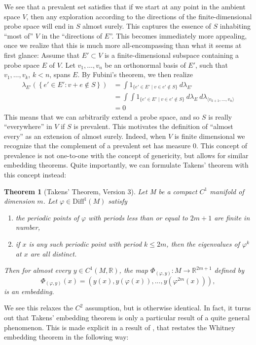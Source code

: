 \documentclass[11pt, a4paper]{memoir}
\theoremstyle{break}
\newtheorem{thm}{Theorem}
\theoremstyle{break}
\theoremstyle{nonumberplain}
\newcommand{\mR}{\mathbb{R}}
\begin{document}
We see that a prevalent set satisfies that if we start at any point in the ambient space $V$, then any exploration according to the directions of the finite-dimensional probe space will end in $S$ almost surely. This captures the essence of $S$ inhabiting \enquote{most of} $V$ in the \enquote{directions of $E$}. This becomes immediately more appealing, once we realize that this is much more all-encompassing than what it seems at first glance: Assume that $E'\subset V$ is a finite-dimensional subspace containing a probe space $E$ of $V$. Let $v_1,\ldots,v_n$ be an orthonormal basis of $E'$, such that $v_1,\ldots,v_k$, $k<n$, spans $E$. By Fubini's theorem, we then realize
\begin{align*}
\lambda_{E'}\left(\left\{e'\in E':v+e\not\in S\right\}\right)&=\int 1_{\{e'\in E'\mid v\in e'\notin S\}}\ d\lambda_{E'}\\
&=\int\int 1_{\{e'\in E'\mid  v\in e'\notin S\}}\ d\lambda_{E}\ d\lambda_{\langle v_{k+1},\ldots, v_n \rangle}\\
&=0
\end{align*}
This means that we can arbitrarily extend a probe space, and so $S$ is really \enquote{everywhere} in $V$ if $S$ is prevalent. This motivates the definition of \enquote{almost every} as an extension of almost surely. Indeed, when $V$ is finite dimensional we recognize that the complement of a prevalent set has measure 0. This concept of prevalence is not one-to-one with the concept of genericity, but allows for similar embedding theorems. Quite importantly, we can formulate Takens' theorem with this concept instead:
\begin{thm}[Takens' Theorem, Version 3]
Let M be a compact $C^1$ manifold of dimension $m$. Let $\varphi\in\text{Diff}^1(M)$ satisfy
\begin{enumerate}[label=\arabic*)]
	\item the periodic points of $\varphi$ with periods less than or equal to $2m+1$ are finite in number,
	\item if $x$ is any such periodic point with period $k\leqslant 2m$, then the eigenvalues of $\varphi^k$ at $x$ are all distinct.
\end{enumerate}
 Then for almost every $y\in C^1(M,\mR)$, the map $\Phi_{(\varphi,y)}:M\to \mathbb{R}^{2m+1}$ defined by
$$\Phi_{(\varphi,y)}(x)=(y(x),y(\varphi(x)),...,y(\varphi^{2m}(x))),$$
is an embedding. \cite{Sauer1991}
\end{thm}
We see this relaxes the $C^2$ assumption, but is otherwise identical. In fact, it turns out that Takens' embedding theorem is only a particular result of a quite general phenomenon. This is made explicit in a result of \cite{Sauer1991}, that restates the Whitney embedding theorem in the following way:
\end{document}
